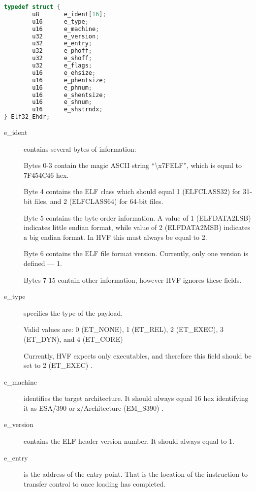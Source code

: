 \cbstart
\begin{lstlisting}[language=C]
typedef struct {
        u8       e_ident[16];
        u16      e_type;
        u16      e_machine;
        u32      e_version;
        u32      e_entry;
        u32      e_phoff;
        u32      e_shoff;
        u32      e_flags;
        u16      e_ehsize;
        u16      e_phentsize;
        u16      e_phnum;
        u16      e_shentsize;
        u16      e_shnum;
        u16      e_shstrndx;
} Elf32_Ehdr;
\end{lstlisting}
\cbend

\begin{description}
\item[e\_ident] contains several bytes of information:
	
	Bytes 0-3 contain the magic ASCII string ``\textbackslash x7FELF'', which is
	equal to 7F454C46 hex.

	Byte 4 contains the ELF class which should equal 1 \cbstart
	(ELFCLASS32) \cbend for 31-bit files, and 2 \cbstart (ELFCLASS64)
	\cbend for 64-bit files.

	Byte 5 contains the byte order information.  A value of 1 \cbstart
	(ELFDATA2LSB) \cbend indicates little endian format, while value of
	2 \cbstart (ELFDATA2MSB) \cbend indicates a big endian format.  In
	HVF this must always be equal to 2.

	Byte 6 contains the ELF file format version.  Currently, only one
	version is defined --- 1.

	Bytes 7-15 contain other information, however HVF ignores these
	fields.

\item[e\_type] specifies the type of the payload.

	\cbstart
	Valid values are: 0 (ET\_NONE), 1 (ET\_REL), 2 (ET\_EXEC), 3
	(ET\_DYN), and 4 (ET\_CORE)
	\cbend

	Currently, HVF expects only executables, and therefore this field
	should be set to 2 \cbstart (ET\_EXEC) \cbend.

\item[e\_machine] identifies the target architecture.  It should always
	equal 16 hex identifying it as ESA/390 or z/Architecture \cbstart
	(EM\_S390) \cbend.

\item[e\_version] contains the ELF header version number.  It should always
	equal to 1.

\item[e\_entry] is the address of the entry point.  That is the location of
	the instruction to transfer control to once loading has completed.


\end{description}

